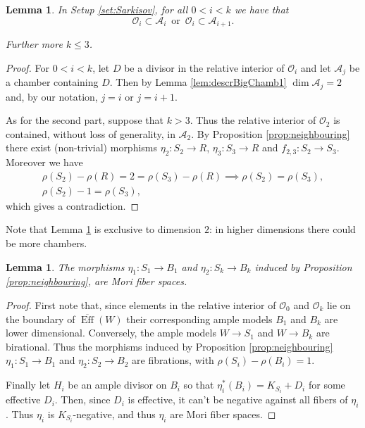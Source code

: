 \documentclass[a4paper,11pt]{amsart}
\newtheorem{lemma}[theorem]{Lemma}
\def\dim{\operatorname{dim}}
\def\Eff{\operatorname{Eff}}
\newcommand{\OO}{\mathcal{O}}
\newcommand{\Aa}{\mathcal{A}}
\begin{document}
\begin{lemma}\label{lem:kleq3}
	In Setup \ref{set:Sarkisov}, for all $0<i<k$ we have that
	\[
	\OO_i \subset \Aa_i \, \text{ or } \, \OO_i \subset \Aa_{i+1}.
	\]
	
	Further more $k \leq 3$.
\end{lemma}

\begin{proof}
	For $0<i<k$, let $D$ be a divisor in the relative interior of $\OO_i$ and let $\Aa_j$ be a chamber containing $D$.
	Then by Lemma \ref{lem:descrBigChamb1} $\dim\Aa_j = 2$ and, by our notation, $j = i$ or $j = i+1$.
	
	As for the second part, suppose that $k > 3$.
	Thus the relative interior of $\OO_2$ is contained, without loss of generality, in $\Aa_2$.
	By Proposition \ref{prop:neighbouring} there exist (non-trivial) morphisms
	$\eta_2 \colon S_2 \to R$, $\eta_3 \colon S_3 \to R$ and $f_{2,3}\colon S_2 \to S_3$.
	Moreover we have
	\begin{gather*}
		\rho(S_2) - \rho(R) = 2 = \rho(S_3) - \rho(R) \implies \rho(S_2) =\rho(S_3),\\
		\rho(S_2) - 1 = \rho(S_3),		
	\end{gather*}
	which gives a contradiction.
\end{proof}

Note that Lemma \ref{lem:kleq3} is exclusive to dimension $2$: in higher dimensions there could be more chambers.


\begin{lemma}\label{lem:1dimWindows}
	The morphisms $\eta_1\colon S_1 \to B_1$ and $\eta_2\colon S_k \to B_k$ induced by Proposition \ref{prop:neighbouring}, are Mori fiber spaces.
\end{lemma}

\begin{proof}
	First note that, since elements in the relative interior of $\OO_0$ and $\OO_k$ lie on the boundary of $\overline{\Eff}(W)$ their corresponding ample models $B_1$ and $B_k$ are lower dimensional.
	Conversely, the ample models $W \to S_1$ and $W \to B_k$ are birational.
	Thus the morphisms induced by Proposition \ref{prop:neighbouring} $\eta_1\colon S_1 \to B_1$ and $\eta_2\colon S_2 \to B_2$ are fibrations, with $\rho(S_i) - \rho(B_i) = 1$.
	
	Finally let $H_i$ be an ample divisor on $B_i$ so that $\eta_i^*(B_i) = K_{S_i} + D_i$ for some effective $D_i$.
	Then, since $D_i$ is effective, it can't be negative against all fibers of $\eta_i$.
	Thus $\eta_i$ is $K_{S_i}$-negative, and thus $\eta_i$ are Mori fiber spaces.
\end{proof}
\end{document}
